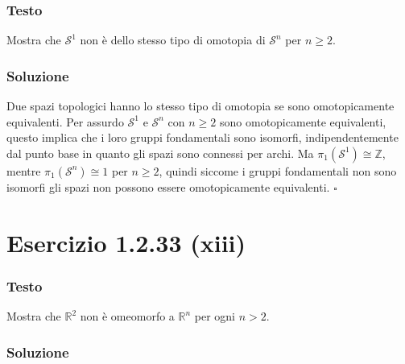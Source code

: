 \documentclass[10pt, toc=sectionentrywithdots]{scrartcl}
\newcommand{\Z}{\mathbb{Z}}
\newcommand{\Sph}[1][]{\mathcal{S}^#1}
\begin{document}
\subsubsection*{Testo}

Mostra che $ \Sph{1} $ non è dello stesso tipo di omotopia
di $ \Sph{n} $ per $ n \geq 2 $.

\subsubsection*{Soluzione}

Due spazi topologici hanno lo stesso tipo di omotopia se sono omotopicamente
equivalenti. Per assurdo $ \Sph{1} $ e $ \Sph{n} $ con $ n \geq 2 $ sono
omotopicamente equivalenti, questo implica che i loro gruppi fondamentali sono
isomorfi, indipendentemente dal punto base in quanto gli spazi sono connessi per
archi. Ma $ \pi_1(\Sph{1}) \cong \Z $, mentre $ \pi_1(\Sph{n}) \cong 1 $ per
$ n \geq 2 $, quindi siccome i gruppi fondamentali non sono isomorfi gli spazi non
possono essere omotopicamente equivalenti. \hfill $ \square $

\section[1.2.33 (xiii)]{Esercizio 1.2.33 (xiii)}

\subsubsection*{Testo}
Mostra che $ \mathbb{R}^{2} $ non è omeomorfo a $ \mathbb{R}^{n} $ per ogni
$ n > 2 $.

\subsubsection*{Soluzione}
\end{document}
